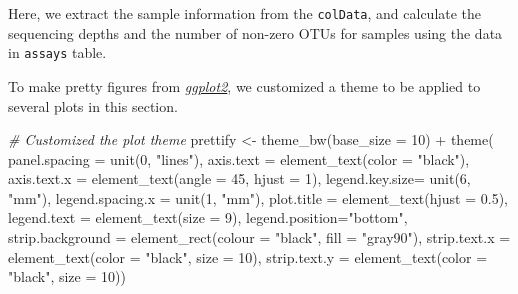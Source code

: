 \documentclass[]{article}
\newcommand{\hlnum}[1]{\textcolor[rgb]{0.816,0.125,0.439}{#1}}%
\newcommand{\hlstr}[1]{\textcolor[rgb]{0.251,0.627,0.251}{#1}}%
\newcommand{\hlcom}[1]{\textcolor[rgb]{0.502,0.502,0.502}{\textit{#1}}}%
\newcommand{\hlopt}[1]{\textcolor[rgb]{0,0,0}{#1}}%
\newcommand{\hlstd}[1]{\textcolor[rgb]{0.251,0.251,0.251}{#1}}%
\newcommand{\hlkwc}[1]{\textcolor[rgb]{0.251,0.251,0.251}{#1}}%
\newcommand{\hlkwd}[1]{\textcolor[rgb]{0.878,0.439,0.125}{#1}}%
\newenvironment{Shaded}{\begin{myshaded}}{\end{myshaded}}
\newcommand{\KeywordTok}[1]{\hlkwd{#1}}
\newcommand{\DataTypeTok}[1]{\hlkwc{#1}}
\newcommand{\DecValTok}[1]{\hlnum{#1}}
\newcommand{\FloatTok}[1]{\hlnum{#1}}
\newcommand{\StringTok}[1]{\hlstr{#1}}
\newcommand{\CommentTok}[1]{\hlcom{#1}}
\newcommand{\OperatorTok}[1]{\hlopt{#1}}
\newcommand{\NormalTok}[1]{\hlstd{#1}}
\begin{document}
Here, we extract the sample information from the \texttt{colData}, and calculate the sequencing depths and the number of non-zero OTUs for samples using the data in \texttt{assays} table.

\begin{Shaded}
\end{Shaded}

To make pretty figures from \emph{\href{https://CRAN.R-project.org/package=ggplot2}{ggplot2}}, we customized a theme to be applied to several plots in this section.

\begin{Shaded}
\begin{Highlighting}[]
\CommentTok{# Customized the plot theme}
\NormalTok{prettify <-}\StringTok{ }\KeywordTok{theme_bw}\NormalTok{(}\DataTypeTok{base_size =} \DecValTok{10}\NormalTok{) }\OperatorTok{+}\StringTok{ }\KeywordTok{theme}\NormalTok{(}
    \DataTypeTok{panel.spacing =} \KeywordTok{unit}\NormalTok{(}\DecValTok{0}\NormalTok{, }\StringTok{"lines"}\NormalTok{),}
    \DataTypeTok{axis.text =} \KeywordTok{element_text}\NormalTok{(}\DataTypeTok{color =} \StringTok{"black"}\NormalTok{),}
    \DataTypeTok{axis.text.x =} \KeywordTok{element_text}\NormalTok{(}\DataTypeTok{angle =} \DecValTok{45}\NormalTok{, }\DataTypeTok{hjust =} \DecValTok{1}\NormalTok{),}
    \DataTypeTok{legend.key.size=} \KeywordTok{unit}\NormalTok{(}\DecValTok{6}\NormalTok{, }\StringTok{"mm"}\NormalTok{),}
    \DataTypeTok{legend.spacing.x =} \KeywordTok{unit}\NormalTok{(}\DecValTok{1}\NormalTok{, }\StringTok{"mm"}\NormalTok{),}
    \DataTypeTok{plot.title =} \KeywordTok{element_text}\NormalTok{(}\DataTypeTok{hjust =} \FloatTok{0.5}\NormalTok{),}
    \DataTypeTok{legend.text =} \KeywordTok{element_text}\NormalTok{(}\DataTypeTok{size =} \DecValTok{9}\NormalTok{),}
    \DataTypeTok{legend.position=}\StringTok{"bottom"}\NormalTok{,}
    \DataTypeTok{strip.background =} \KeywordTok{element_rect}\NormalTok{(}\DataTypeTok{colour =} \StringTok{"black"}\NormalTok{, }\DataTypeTok{fill =} \StringTok{"gray90"}\NormalTok{),}
    \DataTypeTok{strip.text.x =} \KeywordTok{element_text}\NormalTok{(}\DataTypeTok{color =} \StringTok{"black"}\NormalTok{, }\DataTypeTok{size =} \DecValTok{10}\NormalTok{),}
    \DataTypeTok{strip.text.y =} \KeywordTok{element_text}\NormalTok{(}\DataTypeTok{color =} \StringTok{"black"}\NormalTok{, }\DataTypeTok{size =} \DecValTok{10}\NormalTok{))}
\end{Highlighting}
\end{Shaded}
\end{document}
